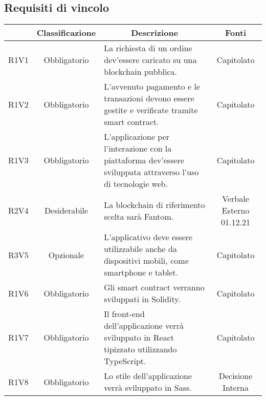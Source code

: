 \subsection{Requisiti di vincolo} \label{subsection:requisiti_vincolo}
\begin{table}[H]
    \centering
    \renewcommand{\arraystretch}{1.8}
    \begin{tabular}{c | c | p{6cm} | c}
        \rowcolor[HTML]{125E28}
        \multicolumn{1}{c}{\color[HTML]{FFFFFF} \textbf{Codice}}          &
        \multicolumn{1}{c}{\color[HTML]{FFFFFF} \textbf{Classificazione}} &
        \multicolumn{1}{c}{\color[HTML]{FFFFFF} \textbf{Descrizione}}     &
        \multicolumn{1}{c}{\color[HTML]{FFFFFF} \textbf{Fonti}}                                                                                                                                                                     \\
        \hline
        R1V1                                                              & Obbligatorio & La richiesta di un ordine dev'essere caricato su una blockchain\glo{} pubblica.                               & Capitolato               \\
        R1V2                                                              & Obbligatorio & L'avvenuto pagamento e le transazioni devono essere gestite e verificate tramite smart contract\glo{}.        & Capitolato               \\
        R1V3                                                              & Obbligatorio & L'applicazione per l'interazione con la piattaforma dev'essere sviluppata attraverso l'uso di tecnologie web. & Capitolato               \\
        R2V4                                                              & Desiderabile & La blockchain\glo{} di riferimento scelta sarà Fantom\glo{}.                                                  & Verbale Esterno 01.12.21 \\
        R3V5                                                              & Opzionale    & L'applicativo deve essere utilizzabile anche da dispositivi mobili, come smartphone e tablet.                 & Capitolato               \\
        R1V6                                                              & Obbligatorio & Gli smart contract\glo{} verranno sviluppati in Solidity\glo{}.                                               & Capitolato               \\
        R1V7                                                              & Obbligatorio & Il front-end\glo{} dell'applicazione verrà sviluppato in React\glo{} tipizzato utilizzando TypeScript\glo{}.  & Capitolato               \\
        R1V8                                                              & Obbligatorio & Lo stile dell'applicazione verrà sviluppato in Sass\glo{}.                                                    & Decisione Interna        \\
    \end{tabular}
\end{table}
